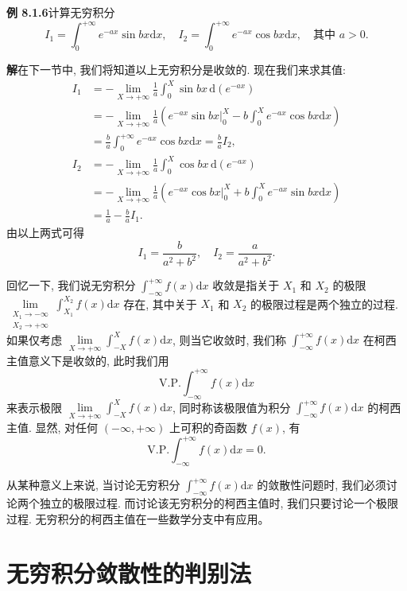 \documentclass[UTF8,12pt,a4paper,fontset=fandol]{ctexart}
\begin{document}
\noindent\textbf{例 8.1.6}\quad 计算无穷积分
\[
  I_1=\int_0^{+\infty}e^{-ax}\sin bx\mathrm dx,\quad
  I_2=\int_0^{+\infty}e^{-ax}\cos bx\mathrm dx,\quad
  \text{其中 }a>0.
\]

\noindent\textbf{解}\quad 在下一节中, 我们将知道以上无穷积分是收敛的. 现在我们来求其值:
\[
\begin{aligned}
  I_1
  &=
  -\lim_{X\to+\infty}\frac1a\int_0^X\sin bx\,\mathrm d(e^{-ax})\\
  &=
  -\lim_{X\to+\infty}\frac1a\left(e^{-ax}\sin bx\big|_0^X
  -
  b\int_0^X e^{-ax}\cos bx\mathrm dx\right)\\
  &=
  \frac ba\int_0^{+\infty}e^{-ax}\cos bx\mathrm dx
  =
  \frac ba I_2,
\end{aligned}
\]
\[
\begin{aligned}
  I_2
  &=
  -\lim_{X\to+\infty}\frac1a\int_0^X\cos bx\,\mathrm d(e^{-ax})\\
  &=
  -\lim_{X\to+\infty}\frac1a\left(e^{-ax}\cos bx\big|_0^X
  +
  b\int_0^X e^{-ax}\sin bx\mathrm dx\right)\\
  &=
  \frac1a-\frac ba I_1.
\end{aligned}
\]
由以上两式可得
\[
  I_1=\frac b{a^2+b^2},\quad I_2=\frac a{a^2+b^2}.
\]

回忆一下, 我们说无穷积分 $\int_{-\infty}^{+\infty}f(x)\mathrm dx$ 收敛是指关于 $X_1$ 和 $X_2$ 的极限\allowbreak $\lim\limits_{\substack{X_1\to-\infty\\ X_2\to+\infty}}\int_{X_1}^{X_2}f(x)\mathrm dx$ 存在, 其中关于 $X_1$ 和 $X_2$ 的极限过程是两个独立的过程. 如果仅考虑 $\lim\limits_{X\to+\infty}\int_{-X}^X f(x)\mathrm dx$, 则当它收敛时, 我们称 $\int_{-\infty}^{+\infty}f(x)\mathrm dx$ 在柯西主值意义下是收敛的, 此时我们用
\[
  \mathrm{V.P.}\int_{-\infty}^{+\infty}f(x)\mathrm dx
\]
来表示极限 $\lim\limits_{X\to+\infty}\int_{-X}^X f(x)\mathrm dx$, 同时称该极限值为积分 $\int_{-\infty}^{+\infty}f(x)\mathrm dx$ 的柯西主值. 显然, 对任何 $(-\infty,+\infty)$ 上可积的奇函数 $f(x)$, 有
\[
  \mathrm{V.P.}\int_{-\infty}^{+\infty}f(x)\mathrm dx=0.
\]

从某种意义上来说, 当讨论无穷积分 $\int_{-\infty}^{+\infty}f(x)\mathrm dx$ 的敛散性问题时, 我们必须讨论两个独立的极限过程. 而讨论该无穷积分的柯西主值时, 我们只要讨论一个极限过程. 无穷积分的柯西主值在一些数学分支中有应用。

\section{无穷积分敛散性的判别法}
\end{document}
